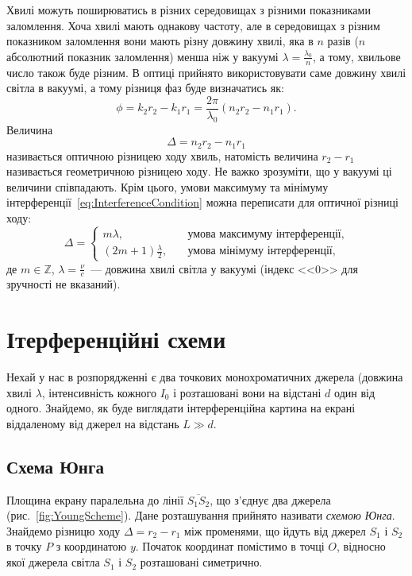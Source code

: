 Хвилі можуть поширюватись в різних середовищах з різними показниками заломлення. Хоча хвилі мають однакову частоту, але в середовищах з різним показником заломлення вони мають різну довжину хвилі, яка в $n$ разів ($n$ абсолютний показник заломлення) менша ніж у вакуумі $\lambda = \frac{\lambda_0}{n}$, а тому, хвильове число також буде різним. В оптиці прийнято використовувати саме довжину хвилі світла в вакуумі, а тому різниця фаз буде визначатись як:
\[
    \phi  = k_2 r_2 - k_1 r_1 = \frac{2\pi}{\lambda_0} (n_2 r_2 - n_1 r_1).
\]
Величина 
\begin{equation}\label{eq:optdeiff}
    \Delta = n_2 r_2 - n_1 r_1
\end{equation}
називається оптичною різницею ходу хвиль, натомість величина $r_2 - r_1$ називається геометричною різницею ходу. Не важко зрозуміти, що у вакуумі ці величини співпадають. Крім цього, умови максимуму та мінімуму інтерференції~\eqref{eq:InterferenceCondition} можна переписати для оптичної різниці ходу:
\begin{equation}\label{eq:InterferenceConditionDelta}
    \Delta=
    \begin{cases}
        m \lambda, &\quad \text{умова максимуму інтерференції}, \\
        (2m + 1)\frac{\lambda}{2}, &\quad\text{умова мінімуму інтерференції},
    \end{cases}
\end{equation}
де $m \in \mathbb{Z}$, $\lambda = \frac{\nu}{c}$~--- довжина хвилі світла у вакуумі (індекс <<0>> для зручності не вказаний).

\section{Ітерференційні схеми}

Нехай у нас в розпорядженні є два точкових монохроматичних джерела (довжина хвилі $\lambda$, інтенсивність кожного $I_0$ і розташовані вони на відстані $d$ один від одного. Знайдемо, як буде виглядати інтерференційна картина на екрані віддаленому від джерел на відстань $L \gg d$.

\subsection{Схема Юнга}

Площина екрану паралельна до лінії $\overline{S_1S_2}$, що з'єднує два джерела (рис.~\ref{fig:YoungScheme}). Дане розташування прийнято називати \emph{схемою Юнга}. Знайдемо різницю ходу $\Delta = r_2 - r_1$ між променями, що йдуть від джерел $S_1$ і $S_2$ в точку $P$ з координатою $y$. Початок координат помістимо в точці $O$, відносно якої джерела світла $S_1$ і $S_2$ розташовані симетрично.

